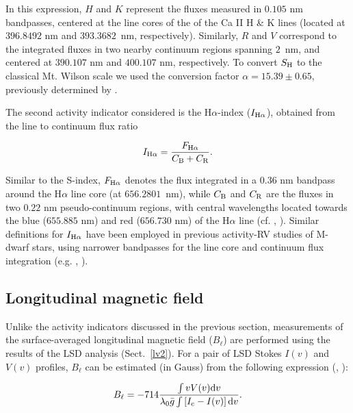 \documentclass[a4paper,fleqn,usenatbib]{mnras}
\begin{document}
\noindent In this expression, $H$ and $K$ represent the fluxes measured in $0.105$ nm bandpasses, centered at the line cores of the of the Ca II H \& K lines (located at $396.8492$ nm and $393.3682$~nm, respectively). Similarly, $R$ and $V$ correspond to the integrated fluxes in two nearby continuum regions spanning $2$~nm, and centered at $390.107$ nm and $400.107$ nm, respectively. To convert $S_{\rm H}$ to the classical Mt. Wilson scale we used the conversion factor $\alpha = 15.39 \pm 0.65$, previously determined by .

The second activity indicator considered is the H$\alpha$-index ($I_{\rm H\alpha}$), obtained from the line to continuum flux ratio

\begin{equation}\label{eq2}
I _{\rm H\alpha} = \dfrac{F_{\rm H\alpha}}{C_{\rm B}+C_{\rm R}}\mbox{.}
\end{equation}

\noindent Similar to the S-index, $F_{\rm H\alpha}$ denotes the flux integrated in a $0.36$ nm bandpass around the H$\alpha$ line core (at $656.2801$~nm), while $C_{\rm B}$ and $C_{\rm R}$ are the fluxes in two $0.22$ nm pseudo-continuum regions, with central wavelengths located towards the blue ($655.885$ nm) and red ($656.730$ nm) of the H$\alpha$ line (cf. , ). Similar definitions for $I_{\rm H\alpha}$ have been employed in previous activity-RV studies of M-dwarf stars, using narrower bandpasses for the line core and continuum flux integration (e.g. , ).

\subsection{Longitudinal magnetic field}\label{sec_bl}

Unlike the activity indicators discussed in the previous section, measurements of the surface-averaged longitudinal magnetic field ($B_{\ell}$) are performed using the results of the LSD analysis (Sect.~\ref{lv2}). For a pair of LSD Stokes $I(v)$ and $V(v)$ profiles, $B_{\ell}$ can be estimated (in Gauss) from the following expression (, ):

\begin{equation}\label{eq3}
B _{\ell} = -714\dfrac{\int v V(v){\rm d}v}{\lambda_0\bar{g}\int\left[I_{\rm c} - I(v)\right]{\rm d}v}\mbox{.}
\end{equation}
\end{document}
